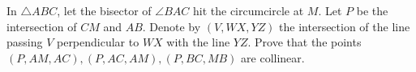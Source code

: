 In $\triangle ABC$, let the bisector of $\angle BAC$ hit the circumcircle at $M$. Let $P$ be the intersection of $CM$ and $AB$. Denote by $(V,WX,YZ)$ the intersection of the line passing $V$ perpendicular to $WX$ with the line $YZ$. Prove that the points $(P,AM,AC), (P,AC,AM), (P,BC,MB)$ are collinear.

